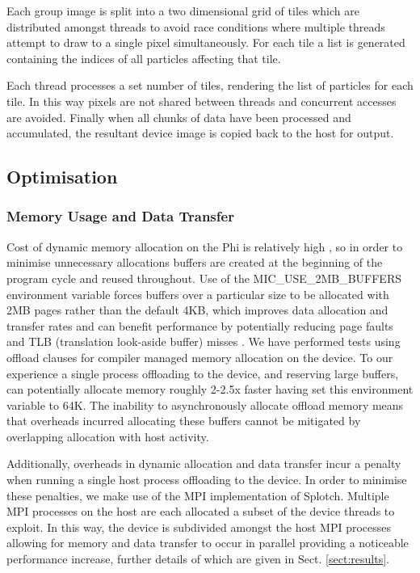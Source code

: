 \documentclass[runningheads,a4paper]{llncs}
\begin{document}
Each group image is split into a two dimensional grid of tiles which are distributed amongst threads to avoid race 
conditions where multiple threads attempt to draw to a single pixel simultaneously. For each tile a list is generated 
containing the indices of all particles affecting that tile.

Each thread processes a set number of tiles, rendering the list of particles for each tile. 
In this way pixels are not shared between threads and concurrent accesses are avoided. Finally when all 
chunks of data have been processed and accumulated, the resultant device image is copied back to the host for output. 

\subsection{Optimisation}
\label{sect:micoptimisation}

\subsubsection{Memory Usage and Data Transfer}
\label{sect:memusage}

Cost of dynamic memory allocation on the Phi is relatively high \cite{mem_alloc}, so in order to minimise unnecessary allocations 
buffers are created at the beginning of the program cycle and reused throughout. Use of the MIC\_USE\_2MB\_BUFFERS 
environment variable forces buffers over a particular size to be allocated with 2MB pages rather than the default 4KB, 
which improves data allocation and transfer rates and can benefit performance by potentially reducing page 
faults and TLB (translation look-aside buffer) misses \cite{env_var_buf}. We have performed tests using offload clauses for compiler 
managed memory allocation on the device. To our experience a single process offloading to the device, and reserving large buffers, can
potentially allocate memory roughly 2-2.5x faster having set this environment variable to 64K. The inability to asynchronously 
allocate offload memory means that overheads incurred allocating these buffers cannot be mitigated by overlapping allocation with host activity.

Additionally, overheads in dynamic allocation and data transfer incur a penalty when running a single host process 
offloading to the device. In order to minimise these penalties, we make use of the MPI implementation of Splotch. 
Multiple MPI processes on the host are each allocated a subset of the device threads to exploit. In this way, the device is 
subdivided amongst the host MPI processes allowing for memory and data transfer to occur in parallel providing a noticeable 
performance increase, further details of which are given in Sect. \ref{sect:results}.
\end{document}
